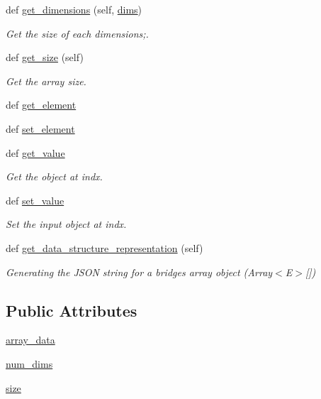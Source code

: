 \begin{DoxyCompactItemize}
def \hyperlink{class_bridges_1_1array_1_1_array_ae1c8790e3892cf5fc1498f5f90178d3c}{get\+\_\+dimensions} (self, \hyperlink{class_bridges_1_1array_1_1_array_ac037f96fff9569134da9d66e33bc1f0f}{dims})
\begin{DoxyCompactList}\small\item\em Get the size of each dimensions;. \end{DoxyCompactList}\item 
def \hyperlink{class_bridges_1_1array_1_1_array_ac61f92d0248dd8b39383a050878219fb}{get\+\_\+size} (self)
\begin{DoxyCompactList}\small\item\em Get the array size. \end{DoxyCompactList}\item 
def \hyperlink{class_bridges_1_1array_1_1_array_a453fb1b2948825410c6ba75b0572a412}{get\+\_\+element}
\item 
def \hyperlink{class_bridges_1_1array_1_1_array_ad674a9aed058deb0e6c8ce6499390aad}{set\+\_\+element}
\item 
def \hyperlink{class_bridges_1_1array_1_1_array_aafaa278382aa435a51c26b2e5e4f68aa}{get\+\_\+value}
\begin{DoxyCompactList}\small\item\em Get the object at \textquotesingle{}indx\textquotesingle{}. \end{DoxyCompactList}\item 
def \hyperlink{class_bridges_1_1array_1_1_array_a360d3340a5bc129b6a617989d47a615f}{set\+\_\+value}
\begin{DoxyCompactList}\small\item\em Set the input object at \textquotesingle{}indx\textquotesingle{}. \end{DoxyCompactList}\item 
def \hyperlink{class_bridges_1_1array_1_1_array_a052a58caa8082e8d6ff49b9f6f2c1884}{get\+\_\+data\+\_\+structure\+\_\+representation} (self)
\begin{DoxyCompactList}\small\item\em Generating the J\+S\+O\+N string for a bridges array object (Array$<$\+E$>$\mbox{[}\mbox{]}) \end{DoxyCompactList}\end{DoxyCompactItemize}
\subsection*{Public Attributes}
\begin{DoxyCompactItemize}
\item 
\hyperlink{class_bridges_1_1array_1_1_array_a2feba9dfd52b01c5b08a477743d33145}{array\+\_\+data}
\item 
\hyperlink{class_bridges_1_1array_1_1_array_a82ed37448b0bdb13519b85f8e8bc81e2}{num\+\_\+dims}
\item 
\hyperlink{class_bridges_1_1array_1_1_array_a9f23993cd6d215880b0c126d459f05d2}{size}
\end{DoxyCompactItemize}

